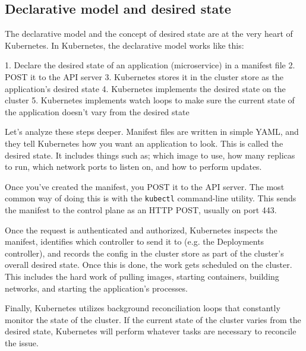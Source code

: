 \documentclass[10pt,a4paper]{report}
\begin{document}
\subsection{Declarative model and desired state}

The declarative model and the concept of desired state are at the very heart of Kubernetes. In Kubernetes, the declarative model works like this:

1. Declare the desired state of an application (microservice) in a manifest file
2. POST it to the API server
3. Kubernetes stores it in the cluster store as the application’s desired state
4. Kubernetes implements the desired state on the cluster
5. Kubernetes implements watch loops to make sure the current state of the application doesn’t vary from the desired state

Let’s analyze these steps deeper.
Manifest files are written in simple YAML, and they tell Kubernetes how you want an application to look. This is called the desired state. It includes things such as; which image to use, how many replicas to run, which network ports to listen on, and how to perform updates.

Once you’ve created the manifest, you POST it to the API server. The most common way of doing this is with the \texttt{kubectl} command-line utility. This sends the manifest to the control plane as an HTTP POST, usually on port 443.

Once the request is authenticated and authorized, Kubernetes inspects the manifest, identifies which controller to send it to (e.g. the Deployments controller), and records the config in the cluster store as part of the cluster’s overall desired state. Once this is done, the work gets scheduled on the cluster. This includes the hard work of pulling images, starting containers, building networks, and starting the application’s processes.

Finally, Kubernetes utilizes background reconciliation loops that constantly monitor the state of the cluster. If the current state of the cluster varies from the desired state, Kubernetes will perform whatever tasks are necessary to reconcile the issue.
\end{document}
